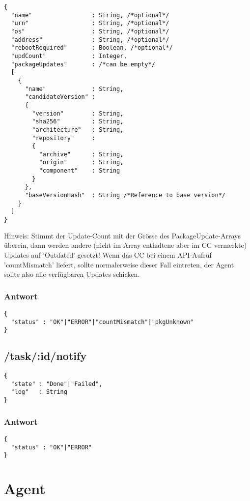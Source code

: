 \begin{verbatim}
{
  "name"                 : String, /*optional*/
  "urn"                  : String, /*optional*/
  "os"                   : String, /*optional*/
  "address"              : String, /*optional*/
  "rebootRequired"       : Boolean, /*optional*/
  "updCount"             : Integer,
  "packageUpdates"       : /*can be empty*/
  [
    {
      "name"             : String,
      "candidateVersion" :
      {
        "version"        : String,
        "sha256"         : String,
        "architecture"   : String,
        "repository"     :
        {
          "archive"      : String,
          "origin"       : String,
          "component"    : String
        }
      },
      "baseVersionHash"  : String /*Reference to base version*/
    }
  ]
}
\end{verbatim}

Hinweis: Stimmt der Update-Count mit der Grösse des PackageUpdate-Arrays überein, dann werden andere (nicht im Array enthaltene aber im CC vermerkte) Updates auf 'Outdated' gesetzt! Wenn das CC bei einem API-Aufruf 'countMismatch' liefert, sollte normalerweise dieser Fall eintreten, der Agent sollte also alle verfügbaren Updates schicken.


\subsubsection*{Antwort}

\begin{verbatim}
{
  "status" : "OK"|"ERROR"|"countMismatch"|"pkgUnknown"
}
\end{verbatim}

\subsection*{/task/:id/notify}

\begin{verbatim}
{
  "state" : "Done"|"Failed",
  "log"   : String
}
\end{verbatim}


\subsubsection*{Antwort}

\begin{verbatim}
{
  "status" : "OK"|"ERROR" 
}
\end{verbatim}

\section*{Agent}

